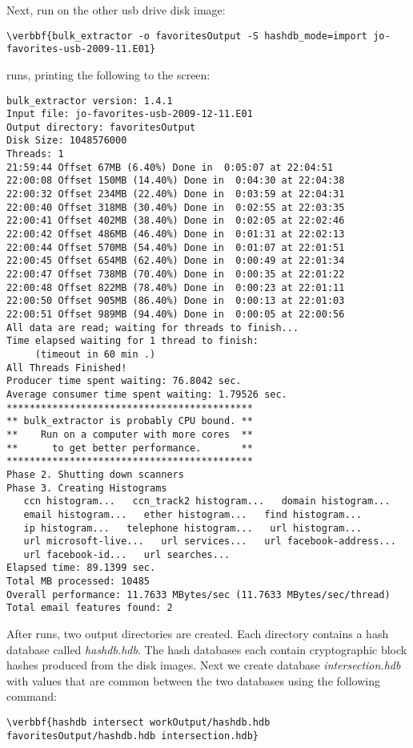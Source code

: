 Next, run \bulk on the other usb drive disk image:
\begin{Verbatim}[commandchars=\\\{\}]
\verbbf{bulk_extractor -o favoritesOutput -S hashdb_mode=import jo-favorites-usb-2009-11.E01}
\end{Verbatim}

\bulk runs, printing the following to the screen: 
\begingroup
\footnotesize
\begin{Verbatim}[fontfamily=courier]
bulk_extractor version: 1.4.1
Input file: jo-favorites-usb-2009-12-11.E01
Output directory: favoritesOutput
Disk Size: 1048576000
Threads: 1
21:59:44 Offset 67MB (6.40%) Done in  0:05:07 at 22:04:51
22:00:08 Offset 150MB (14.40%) Done in  0:04:30 at 22:04:38
22:00:32 Offset 234MB (22.40%) Done in  0:03:59 at 22:04:31
22:00:40 Offset 318MB (30.40%) Done in  0:02:55 at 22:03:35
22:00:41 Offset 402MB (38.40%) Done in  0:02:05 at 22:02:46
22:00:42 Offset 486MB (46.40%) Done in  0:01:31 at 22:02:13
22:00:44 Offset 570MB (54.40%) Done in  0:01:07 at 22:01:51
22:00:45 Offset 654MB (62.40%) Done in  0:00:49 at 22:01:34
22:00:47 Offset 738MB (70.40%) Done in  0:00:35 at 22:01:22
22:00:48 Offset 822MB (78.40%) Done in  0:00:23 at 22:01:11
22:00:50 Offset 905MB (86.40%) Done in  0:00:13 at 22:01:03
22:00:51 Offset 989MB (94.40%) Done in  0:00:05 at 22:00:56
All data are read; waiting for threads to finish...
Time elapsed waiting for 1 thread to finish:
     (timeout in 60 min .)
All Threads Finished!
Producer time spent waiting: 76.8042 sec.
Average consumer time spent waiting: 1.79526 sec.
*******************************************
** bulk_extractor is probably CPU bound. **
**    Run on a computer with more cores  **
**      to get better performance.       **
*******************************************
Phase 2. Shutting down scanners
Phase 3. Creating Histograms
   ccn histogram...   ccn_track2 histogram...   domain histogram...
   email histogram...   ether histogram...   find histogram...
   ip histogram...   telephone histogram...   url histogram...
   url microsoft-live...   url services...   url facebook-address...
   url facebook-id...   url searches...
Elapsed time: 89.1399 sec.
Total MB processed: 10485
Overall performance: 11.7633 MBytes/sec (11.7633 MBytes/sec/thread)
Total email features found: 2
\end{Verbatim}
\endgroup

After \bulk runs, two output directories are created. Each directory contains a hash database called \textit{hashdb.hdb}. The hash databases each contain cryptographic block hashes produced from the disk images.
Next we create database \textit{intersection.hdb} with values that are common between the two databases using the following command:
\begin{Verbatim}[commandchars=\\\{\}]
\verbbf{hashdb intersect workOutput/hashdb.hdb favoritesOutput/hashdb.hdb intersection.hdb}
\end{Verbatim}

